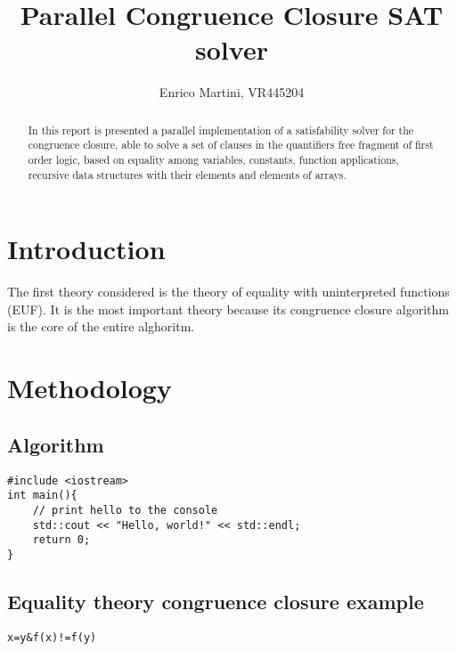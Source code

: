 \documentclass{IEEEtran}
\begin{document}
\title{Parallel Congruence Closure SAT solver}
\author{Enrico Martini, VR445204}
\maketitle
\begin{abstract}
 In this report is presented a parallel implementation of a satisfability solver for the congruence closure, able to solve a set of clauses in the quantifiers free fragment of first order logic, based on equality among variables, constants, function applications, recursive data structures with their elements and elements of arrays.
\end{abstract}
\section{Introduction}
The first theory considered is the theory of equality with uninterpreted functions (EUF). It is the most important theory because its congruence closure algorithm is the core of the entire alghoritm. 
\section{Methodology}


\subsection{Algorithm}
\begin{lstlisting}[style=cpp]
#include <iostream>
int main(){
	// print hello to the console
	std::cout << "Hello, world!" << std::endl;
	return 0;
}
\end{lstlisting}

\subsection{Equality theory congruence closure example}


\begin{lstlisting}
x=y&f(x)!=f(y)
\end{lstlisting}

\begin {center}
\end{center}
\end{document}
